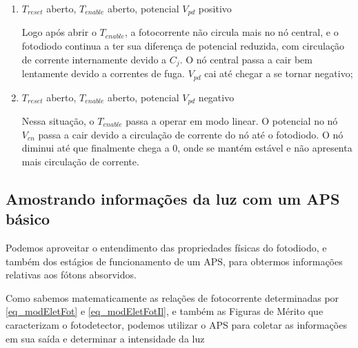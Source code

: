 \begin{enumerate}
\begin{equation}
    \label{eq_voutfinal}
    V_{out}(t) = V_0-\frac{I_{PH}}{C_j+C_{cn}}t - V_{GS\_buffer}
\end{equation}

Onde:

\begin{itemize}
    \item $V_{out}(t)$ \'e a tensão de saída do APS em determinado tempo $t$ [$V$]
    \item $V_{GS\_buffer}$ \'e a diferença de potencial entre $V_{cn}$ e $V_{out}(t)$, que considerando-se a ausência de efeitos de carga, e que $T_{buffer}$ esteja sempre na região de saturação no Estágio 2, é uma constante [$V$]
\end{itemize}

\item $T_{reset}$ aberto, $T_{enable}$ aberto, potencial \textit{$V_{pd}$} positivo

Logo ap\'os abrir o $T_{enable}$, a fotocorrente não circula mais no n\'o central, e o fotodiodo continua a ter sua diferença de potencial reduzida, com circulação de corrente internamente devido a $C_j$. O n\'o central passa a cair bem lentamente devido a correntes de fuga. \textit{$V_{pd}$} cai at\'e chegar a se tornar negativo;

\item \textit{$T_{reset}$} aberto, \textit{$T_{enable}$} aberto, potencial \textit{$V_{pd}$} negativo

Nessa situação, o $T_{enable}$ passa a operar em modo linear. O potencial no n\'o $V_{cn}$ passa a cair devido a circulação de corrente do n\'o at\'e o fotodiodo. O nó diminui at\'e que finalmente chega a 0, onde se mant\'em estável e não apresenta mais circulação de corrente.

\end{enumerate}

\subsection{Amostrando informações da luz com um APS básico}
\label{secao_amostrando}

Podemos aproveitar o entendimento das propriedades f\'isicas do fotodiodo, e tamb\'em dos est\'agios de funcionamento de um APS, para obtermos informações relativas aos f\'otons absorvidos.

Como sabemos matematicamente as relações de fotocorrente determinadas por \autoref{eq_modEletFot} e \autoref{eq_modEletFotIl}, e tamb\'em as Figuras de M\'erito que caracterizam o fotodetector, podemos utilizar o APS para coletar as informações em sua sa\'ida e determinar a intensidade da luz

